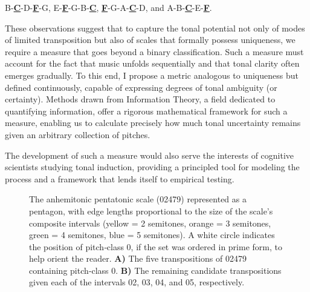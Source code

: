 \documentclass[10pt,twocolumn]{article}
\numberwithin{equation}{section} %
\begin{document}
    B\text{$\flat$}-\textbf{\underline{C}}-D-\textbf{\underline{F}}-G,     E\text{$\flat$}-\textbf{\underline{F}}-G-B\text{$\flat$}-\textbf{\underline{C}},     \textbf{\underline{F}}-G-A-\textbf{\underline{C}}-D,     and     A\text{$\flat$}-B\text{$\flat$}-\textbf{\underline{C}}-E\text{$\flat$}-\textbf{\underline{F}}.

    These observations suggest that to capture the tonal potential not only of modes of limited transposition but also of scales that formally possess uniqueness, we require a measure that goes beyond a binary classification.
    Such a measure must account for the fact that music unfolds sequentially and that tonal clarity often emerges gradually.
    To this end, I propose a metric analogous to uniqueness but defined continuously, capable of expressing degrees of tonal ambiguity (or certainty).
    Methods drawn from Information Theory, a field dedicated to quantifying information, offer a rigorous mathematical framework for such a measure, enabling us to calculate precisely how much tonal uncertainty remains given an arbitrary collection of pitches.

    The development of such a measure would also serve the interests of cognitive scientists studying tonal induction, providing a principled tool for modeling the process and a framework that lends itself to empirical testing.

    \begin{figure}[htbp]
        \centering
        \caption{The anhemitonic pentatonic scale (02479) represented as a pentagon, with edge lengths proportional to the size of the scale's composite intervals (yellow = 2 semitones, orange = 3 semitones, green = 4 semitones, blue = 5 semitones).
        A white circle indicates the position of pitch‑class 0, if the set was ordered in prime form, to help orient the reader.
        \textbf{A)} The five transpositions of 02479 containing pitch‑class 0.
        \textbf{B)} The remaining candidate transpositions given each of the intervals 02, 03, 04, and 05, respectively.}
        \label{fig:necklaces}
    \end{figure}
\end{document}
